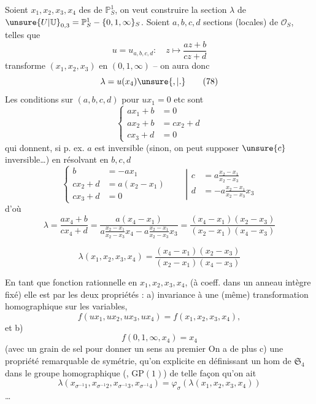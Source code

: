 Soient $x_1,x_2,x_3,x_4$ des  de
$\mathbb P^1_S$, on veut construire la section  $\lambda$
de $\unsure{U|\mathbb U}_{0,3}=\mathbb P^1_S-\{0,1,\infty\}_S$.
Soient $a,b,c,d$ sections
(locales) de $\mathcal O_S$,  telles que
\[
u=u_{a,b,c,d}:\quad z\longmapsto\frac{az+b}{cz+d}
\tag{77}
\]
transforme $(x_1,x_2,x_3)$ en $(0,1,\infty)$ -- on
aura donc
\[
\lambda=u(x_4)\unsure{,|.}
\tag{78}
\]
Les conditions sur  $(a,b,c,d)$ pour $ux_1=0$ etc sont
\[
\left\{\begin{aligned}
ax_1+b&=0\\
ax_2+b&=cx_2+d\\
cx_3+d&=0
\end{aligned}\right.
\]
qui donnent, si p. ex. $a$ est inversible (sinon, on
peut supposer $\unsure{c}$ inversible\ldots) en résolvant en $b,c,d$
\[
\left\{\begin{aligned}
b&=-ax_1\\
cx_2+d&=a(x_2-x_1)\\
cx_3+d&=0
\end{aligned}\right.
\qquad\left|\begin{aligned}
c&=a\frac{x_2-x_1}{x_2-x_3}\\
d&=-a\frac{x_2-x_1}{x_2-x_3}x_3
\end{aligned}\right.
\]
d'où
\[
\lambda=\frac{ax_4+b}{cx_4+d}
=\frac{a(x_4-x_1)}{a\frac{x_2-x_1}{x_2-x_3}x_4-a\frac{x_2-x_1}{x_2-x_3}x_3}
=\frac{(x_4-x_1)(x_2-x_3)}{(x_2-x_1)(x_4-x_3)}
\]


\[
\lambda(x_1,x_2,x_3,x_4)=\frac{(x_4-x_1)(x_2-x_3)}{(x_2-x_1)(x_4-x_3)}
\tag{79}
\]

En tant que fonction rationnelle en $x_1,x_2,x_3,x_4$,
(à coeff. dans un anneau intègre fixé) elle
est  par les deux propriétés : a) invariance  à une (même) transformation
homographique sur les variables,  
\[
f(ux_1,ux_2,ux_3,ux_4)=f(x_1,x_2,x_3,x_4),
\]
et b)
\[
f(0,1,\infty,x_4)=x_4
\]
(avec un grain de sel pour donner un
sens au premier  On a de plus
c) une propriété remarquable de symétrie,
qu'on  explicite en définissant un hom
de $\mathfrak S_4$ dans le groupe homographique
(, $\mathrm{GP}(1)$)
de telle façon qu'on ait
\[
\lambda(x_{\sigma^{-1}1},x_{\sigma^{-1}2},x_{\sigma^{-1}3},x_{\sigma^{-1}4})
=\varphi_\sigma(\lambda(x_1,x_2,x_3,x_4))
\tag{80}
\]
\ldots
